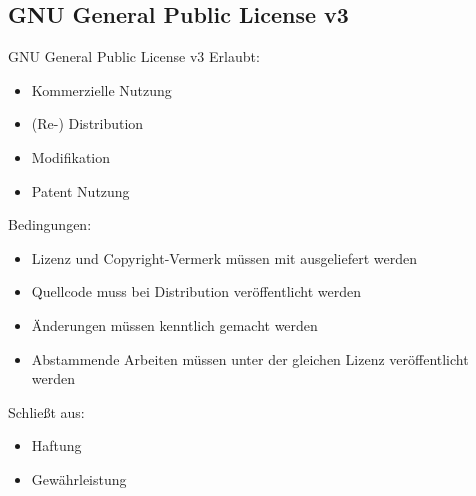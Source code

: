 \documentclass{beamer}
\begin{document}
\subsection{GNU General Public License v3}
\begin{frame}{GNU General Public License v3}
	Erlaubt:
	\begin{itemize}
		\item Kommerzielle Nutzung
		\item (Re-) Distribution
		\item Modifikation
		\item Patent Nutzung
	\end{itemize}

	Bedingungen:
	\begin{itemize}
		\item Lizenz und Copyright-Vermerk müssen mit ausgeliefert werden
		\item Quellcode muss bei Distribution veröffentlicht werden
		\item Änderungen müssen kenntlich gemacht werden
		\item Abstammende Arbeiten müssen unter der gleichen
			Lizenz veröffentlicht werden
	\end{itemize}

	Schließt aus:
	\begin{itemize}
		\item Haftung
		\item Gewährleistung
	\end{itemize}
\end{frame}
\end{document}

